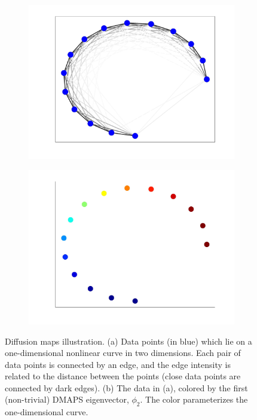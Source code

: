 \documentclass{pnastwo}
\begin{document}
\begin{figure}
\begin{subfigure}{0.25\textwidth}
\includegraphics[width=\textwidth]{dmaps_schematic_edges}
\caption{}
\label{subfig:dmaps_edges}
\end{subfigure}
\begin{subfigure}{0.25\textwidth}
\includegraphics[width=\textwidth]{dmaps_schematic_color}
\caption{}
\label{subfig:dmaps_color}
\end{subfigure}
\caption{Diffusion maps illustration. (a) Data points (in blue) which lie on a one-dimensional nonlinear curve in two dimensions. Each pair of data points is connected by an edge, and the edge intensity is related to the distance between the points (close data points are connected by dark edges). (b) The data in (a), colored by the first (non-trivial) DMAPS eigenvector, $\phi_2$. The color parameterizes the one-dimensional curve. }
\label{fig:dmaps_schematic}
\end{figure}
\end{document}
